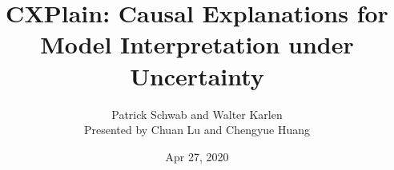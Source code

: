 \documentclass[10pt]{beamer}
\title{CXPlain: Causal Explanations for Model Interpretation under Uncertainty}
\date{Apr 27, 2020}
\author[Patrick Schwab and Walter Karlen]{Patrick Schwab and Walter Karlen \\[5pt]
Presented by Chuan Lu and Chengyue Huang}
\begin{document}
\maketitle


\begin{frame}
\tableofcontents
\end{frame}






\end{document}
